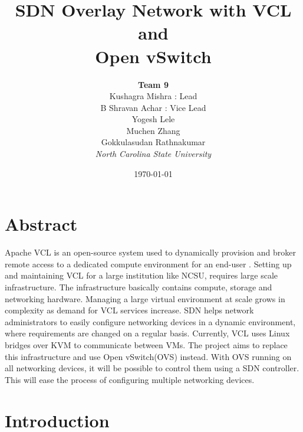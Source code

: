 \documentclass[12pt]{extarticle}
\title{\textbf{SDN Overlay Network with VCL and \\Open vSwitch}}
\date{\today}
\author{\textbf{Team 9} \\Kushagra Mishra : Lead\\
B Shravan Achar : Vice Lead \\ Yogesh Lele \\ Muchen Zhang \\ Gokkulasudan Rathnakumar\\ \textit{North Carolina State University}}
\begin{document}
\maketitle
\pagebreak
\tableofcontents
\pagebreak
\listoffigures
\listoftables
\newpage

\section{Abstract}
Apache VCL is an open-source system used to dynamically provision and broker remote access to a dedicated compute environment for an end-user \cite{vcl}\cite{schaffer2009ncsu}. Setting up and maintaining VCL for a large institution like NCSU, requires large scale infrastructure. The infrastructure basically contains compute, storage and networking hardware. Managing a large virtual environment at scale grows in complexity as demand for VCL services increase. SDN helps network administrators to easily configure networking devices in a dynamic environment, where requirements are changed on a regular basis. Currently, VCL uses Linux bridges over KVM to communicate between VMs. The project aims to replace this infrastructure and use Open vSwitch(OVS) instead. With OVS running on all networking devices, it will be possible to control them using a SDN controller. This will ease the process of configuring multiple networking devices.


\section{Introduction}
\end{document}
